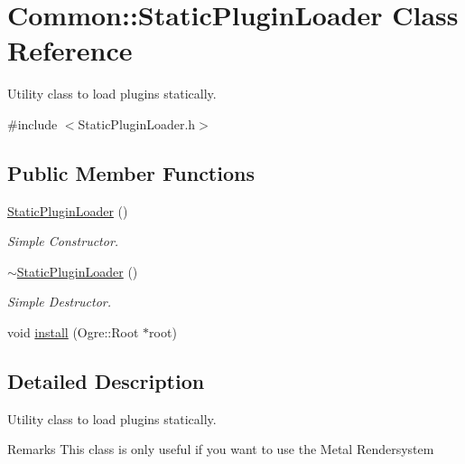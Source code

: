 \hypertarget{class_common_1_1_static_plugin_loader}{}\section{Common\+:\+:Static\+Plugin\+Loader Class Reference}
\label{class_common_1_1_static_plugin_loader}


Utility class to load plugins statically.  




{\ttfamily \#include $<$Static\+Plugin\+Loader.\+h$>$}

\subsection*{Public Member Functions}
\begin{DoxyCompactItemize}
\item 
\mbox{\label{class_common_1_1_static_plugin_loader_a4d07878bdf153243742618252174fdb1}} 
\hyperlink{class_common_1_1_static_plugin_loader_a4d07878bdf153243742618252174fdb1}{Static\+Plugin\+Loader} ()
\begin{DoxyCompactList}\small\item\em Simple Constructor. \end{DoxyCompactList}\item 
\mbox{\label{class_common_1_1_static_plugin_loader_a664472b3a72a71fbe5be7653bcc29b38}} 
\hyperlink{class_common_1_1_static_plugin_loader_a664472b3a72a71fbe5be7653bcc29b38}{$\sim$\+Static\+Plugin\+Loader} ()
\begin{DoxyCompactList}\small\item\em Simple Destructor. \end{DoxyCompactList}\item 
void \hyperlink{class_common_1_1_static_plugin_loader_ad53a802ca29d709d2e2731be6304d274}{install} (Ogre\+::\+Root $\ast$root)
\end{DoxyCompactItemize}


\subsection{Detailed Description}
Utility class to load plugins statically. 

\begin{DoxyRemark}{Remarks}
This class is only useful if you want to use the Metal Rendersystem 
\end{DoxyRemark}


